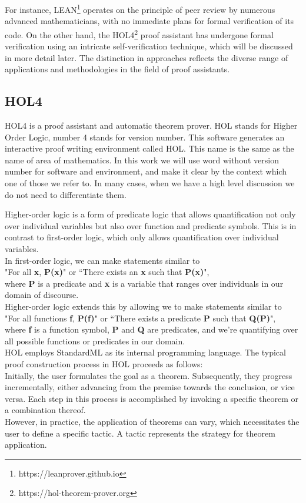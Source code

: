 For instance, LEAN\footnote{https://leanprover.github.io} operates on the principle of peer review by numerous advanced mathematicians, with no immediate plans for formal verification of its code. On the other hand, the HOL4\footnote{https://hol-theorem-prover.org} proof assistant has undergone formal verification using an intricate self-verification technique, which will be discussed in more detail later. The distinction in approaches reflects the diverse range of applications and methodologies in the field of proof assistants.

\subsection{HOL4}
HOL4 is a proof assistant and automatic theorem prover. HOL stands for Higher Order Logic, number 4 stands for version number. This software generates an interactive proof writing environment called HOL. This name is the same as the name of area of mathematics. In this work we will use word  without version number for software and environment, and make it clear by the context which one of those we refer to. In many cases, when we have a high level discussion we do not need to differentiate them. 

Higher-order logic is a form of predicate logic that allows quantification not only over individual variables but also over function and predicate symbols. This is in contrast to first-order logic, which only allows quantification over individual variables.\\
In first-order logic, we can make statements similar to \\
"For all \textbf{x}, \textbf{P(x)}" or ``There exists an \textbf{x} such that \textbf{P(x)}", \\
where \textbf{P} is a predicate and \textbf{x} is a variable that ranges over individuals in our domain of discourse.\\
Higher-order logic extends this by allowing we to make statements similar to\\
"For all functions \textbf{f}, \textbf{P(f)}" or ``There exists a predicate \textbf{P} such that \textbf{Q(P)}", \\
where \textbf{f} is a function symbol, \textbf{P} and \textbf{Q} are predicates, and we're quantifying over all possible functions or predicates in our domain.\\
HOL employs StandardML as its internal programming language. The typical proof construction process in HOL proceeds as follows:\\
Initially, the user formulates the goal as a theorem. Subsequently, they progress incrementally, either advancing from the premise towards the conclusion, or vice versa. Each step in this process is accomplished by invoking a specific theorem or a combination thereof.\\
However, in practice, the application of theorems can vary, which necessitates the user to define a specific tactic. A tactic represents the strategy for theorem application.\\
\newpage
